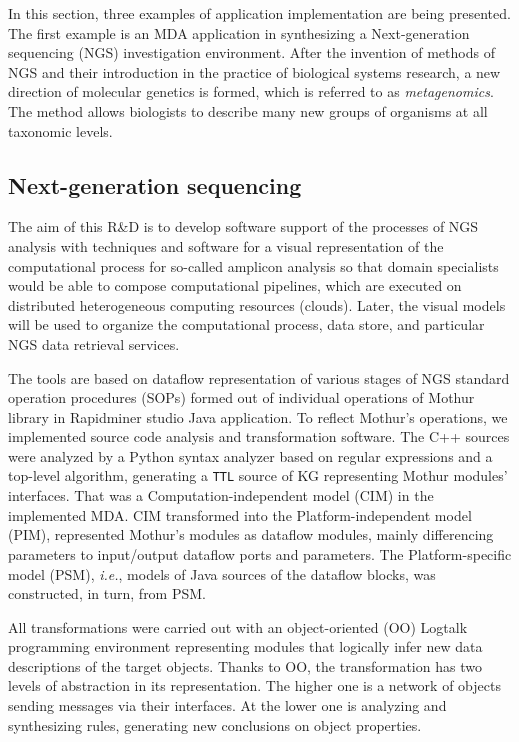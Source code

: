 \documentclass[a4paper]{jctart19a}
\begin{document}
In this section, three examples of application implementation are being presented.  The first example is an MDA application in synthesizing a Next-generation sequencing (NGS) investigation environment.  After the invention of methods of NGS and their introduction in the practice of biological systems research, a new direction of molecular genetics is formed, which is referred to as \emph{metagenomics}.  The method allows biologists to describe many new groups of organisms at all taxonomic levels.

\subsection{Next-generation sequencing}
\label{sec:ngs-impl}

The aim of this R\&D \cite{zont19, aicts2020} is to develop software support of the processes of NGS analysis with techniques and software for a visual representation of the computational process for so-called amplicon analysis so that domain specialists would be able to compose computational pipelines, which are executed on distributed heterogeneous computing resources (clouds).  Later, the visual models will be used to organize the computational process, data store, and particular NGS data retrieval services.

The tools are based on dataflow representation of various stages of NGS standard operation procedures (SOPs)  formed out of individual operations of Mothur library in Rapidminer studio Java application.  To reflect Mothur's operations, we implemented source code analysis and transformation software.  The C++ sources were analyzed by a Python syntax analyzer based on regular expressions and a top-level algorithm, generating a \verb|TTL| source of KG representing Mothur modules' interfaces.  That was a Computation-independent model (CIM) in the implemented MDA.  CIM transformed into the Platform-independent model (PIM), represented Mothur's modules as dataflow modules, mainly differencing parameters to input/output dataflow ports and parameters.  The Platform-specific model (PSM), \emph{i.e.}, models of Java sources of the dataflow blocks, was constructed, in turn, from PSM.

All transformations were carried out with an object-oriented (OO) Logtalk programming environment representing modules that logically infer new data descriptions of the target objects.  Thanks to OO, the transformation has two levels of abstraction in its representation.  The higher one is a network of objects sending messages via their interfaces.  At the lower one is analyzing and synthesizing rules, generating new conclusions on object properties.
\end{document}
